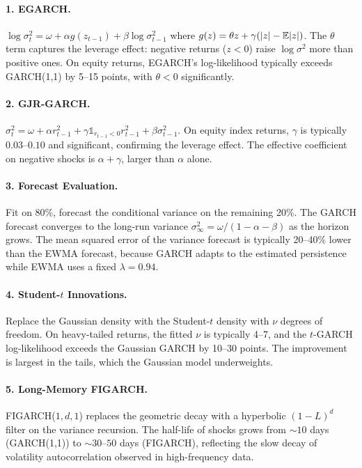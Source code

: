 \paragraph{1. EGARCH.}
$\log \sigma_t^2 = \omega + \alpha g(z_{t-1}) + \beta \log
\sigma_{t-1}^2$ where $g(z) = \theta z + \gamma(|z| - \mathbb{E}|z|)$. The
$\theta$ term captures the leverage effect: negative returns
($z < 0$) raise $\log \sigma^2$ more than positive ones. On equity
returns, EGARCH's log-likelihood typically exceeds GARCH(1,1) by
5--15 points, with $\theta < 0$ significantly.

\paragraph{2. GJR-GARCH.}
$\sigma_t^2 = \omega + \alpha r_{t-1}^2 + \gamma
\mathbb{1}_{r_{t-1}<0} r_{t-1}^2 + \beta \sigma_{t-1}^2$. On equity
index returns, $\gamma$ is typically $0.03$--$0.10$ and
significant, confirming the leverage effect. The effective
coefficient on negative shocks is $\alpha + \gamma$, larger than
$\alpha$ alone.

\paragraph{3. Forecast Evaluation.}
Fit on 80\%, forecast the conditional variance on the remaining 20\%.
The GARCH forecast converges to the long-run variance
$\sigma_\infty^2 = \omega / (1 - \alpha - \beta)$ as the horizon
grows. The mean squared error of the variance forecast is typically
20--40\% lower than the EWMA forecast, because GARCH adapts to the
estimated persistence while EWMA uses a fixed $\lambda = 0.94$.

\paragraph{4. Student-$t$ Innovations.}
Replace the Gaussian density with the Student-$t$ density with $\nu$
degrees of freedom. On heavy-tailed returns, the fitted $\nu$ is
typically 4--7, and the $t$-GARCH log-likelihood exceeds the Gaussian
GARCH by 10--30 points. The improvement is largest in the tails,
which the Gaussian model underweights.

\paragraph{5. Long-Memory FIGARCH.}
FIGARCH($1,d,1$) replaces the geometric decay with a hyperbolic
$(1-L)^d$ filter on the variance recursion. The half-life of
shocks grows from $\sim 10$ days (GARCH(1,1)) to $\sim 30$--$50$
days (FIGARCH), reflecting the slow decay of volatility
autocorrelation observed in high-frequency data.


